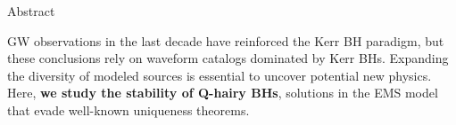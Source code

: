 \begin{block}{Abstract}

\Gls{GW} observations in the last decade have reinforced the Kerr \gls{BH} paradigm, but these conclusions rely on waveform catalogs dominated by Kerr \glspl{BH}. Expanding the diversity of modeled sources is essential to uncover potential new physics. Here, \textbf{we study the stability of Q-hairy \glspl{BH}}, solutions in the \gls{EMS} model that evade well-known uniqueness theorems.

\end{block}
